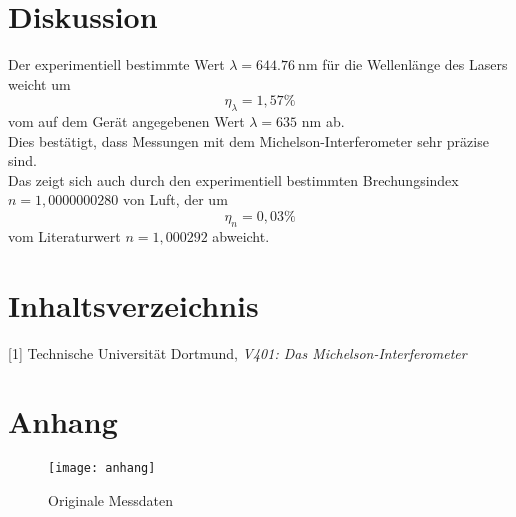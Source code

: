 \section{Diskussion}
\label{sec:Diskussion}

Der experimentiell bestimmte Wert $\lambda = \SI{644,76}{\nano\metre}$ für die Wellenlänge des Lasers weicht um 
\begin{equation*}
    \eta_\lambda = 1,57\%
\end{equation*}
vom auf dem Gerät angegebenen Wert $\lambda = 635$ nm ab. \\
Dies bestätigt, dass Messungen mit dem Michelson-Interferometer sehr präzise sind.\\
Das zeigt sich auch durch den experimentiell bestimmten Brechungsindex $n = 1,0000000280$ von Luft, der um 
\begin{equation*}
    \eta_n = 0,03\%
\end{equation*}
vom Literaturwert $n = 1,000292$ abweicht.\\

\section{Inhaltsverzeichnis}

[1] Technische Universität Dortmund, \textit{V401: Das Michelson-Interferometer}

\section{Anhang}

\begin{figure}[H]
  \centering
  \texttt{[image: anhang]}
  \caption{Originale Messdaten}
  \label{fig:anh}
\end{figure}
